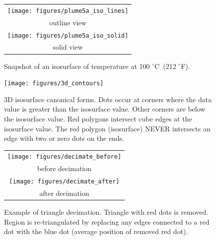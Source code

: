 \documentclass[11pt,twoside]{book}
\newcommand{\degF}{$^\circ$F}
\newcommand{\degC}{$^\circ$C}
\newcommand{\figoptions}{htp}
\begin{document}
\begin{figure}[\figoptions]
\begin{center}
\begin{tabular}{c}
\texttt{[image: figures/plume5a\_iso\_lines]}\\
outline view\\
\texttt{[image: figures/plume5a\_iso\_solid]}\\
solid view
\end{tabular}
\end{center}
\caption{Snapshot of an isosurface of temperature at 100 \degC\ (212 \degF).
  }
\label{figisob}%
\end{figure}

\begin{figure}[\figoptions]
\begin{center}
\texttt{[image: figures/3d\_contours]}
\end{center}
\caption[3D isosurface canonical forms.]{3D isosurface canonical forms.
Dots occur at corners where the data value is greater than the isosurface value.  Other corners are below the isosurface value.  Red polygons intersect cube edges at the isosurface value.  The red polygon (isosurface) NEVER intersects an edge with two or zero dots on the ends.
  }
\label{figisosetup}%
\end{figure}


\begin{figure}[\figoptions]
\begin{center}
\begin{tabular}{c}
\texttt{[image: figures/decimate\_before]}\\
before decimation\\
\texttt{[image: figures/decimate\_after]}\\
after decimation
\end{tabular}
\end{center}
\caption[Example of triangle decimation.]{Example of triangle decimation.  Triangle with red dots is removed.  Region is re-triangulated by replacing any edges connected to a red dot with the blue dot (average position of removed red dot).}
\label{figdecimate}%
\end{figure}

%
%

%

%
%
\end{document}
